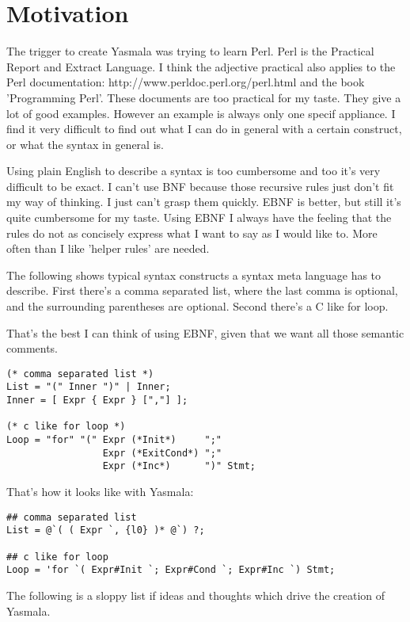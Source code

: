 \documentclass[a4paper]{report}
\begin{document}
\section{Motivation}
The trigger to create Yasmala was trying to learn Perl. Perl is the Practical
Report and Extract Language. I think the adjective practical also applies to the
Perl documentation: http://www.perldoc.perl.org/perl.html and the book
'Programming Perl'. These documents are too practical for my taste. They give a
lot of good examples. However an example is always only one specif appliance. I
find it very difficult to find out what I can do in general with a certain
construct, or what the syntax in general is.

Using plain English to describe a syntax is too cumbersome and too it's very
difficult to be exact. I can't use BNF because those recursive rules just don't
fit my way of thinking. I just can't grasp them quickly. EBNF is better, but
still it's quite cumbersome for my taste. Using EBNF I always have the feeling
that the rules do not as concisely express what I want to say as I would like to.
More often than I like 'helper rules' are needed.

The following shows typical syntax constructs a syntax meta language has to
describe. First there's a comma separated list, where the last comma is
optional, and the surrounding parentheses are optional. Second there's a C like
for loop.

That's the best I can think of using EBNF, given that we want all those semantic
comments. 

\begin{verbatim}
(* comma separated list *)
List = "(" Inner ")" | Inner;
Inner = [ Expr { Expr } [","] ];

(* c like for loop *)
Loop = "for" "(" Expr (*Init*)     ";"
                 Expr (*ExitCond*) ";"
                 Expr (*Inc*)      ")" Stmt;
\end{verbatim}

That's how it looks like with Yasmala:

\begin{verbatim}
## comma separated list
List = @`( ( Expr `, {l0} )* @`) ?;

## c like for loop
Loop = 'for `( Expr#Init `; Expr#Cond `; Expr#Inc `) Stmt;
\end{verbatim}

The following is a sloppy list if ideas and thoughts which drive the creation of
Yasmala.
\end{document}
